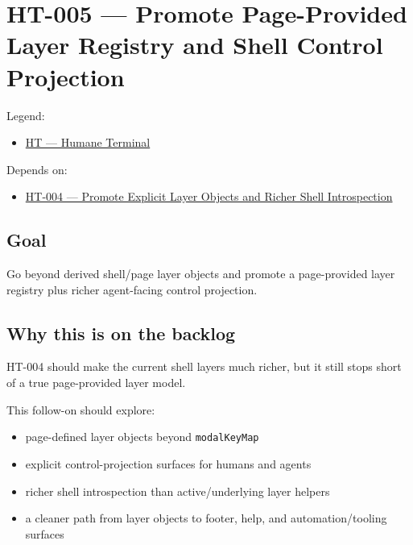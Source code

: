 \chapter{HT-005 --- Promote Page-Provided Layer Registry and Shell Control Projection}\label{record-349}

\smallskip

Legend:

\begin{itemize}
\tightlist
\item
  \href{https://github.com/flyingrobots/bijou/blob/cbd70612140e7a450d764b3c7be1c6af878b99bc/docs/method/graveyard/legends/HT-humane-terminal.md}{HT --- Humane Terminal}
\end{itemize}

Depends on:

\begin{itemize}
\tightlist
\item
  \href{https://github.com/flyingrobots/bijou/blob/cbd70612140e7a450d764b3c7be1c6af878b99bc/docs/method/graveyard/design/HT-004-promote-explicit-layer-objects-and-richer-shell-introspection.md}{HT-004 --- Promote Explicit Layer Objects and Richer Shell Introspection}
\end{itemize}

\section{Goal}\label{record-349-goal}

Go beyond derived shell/page layer objects and promote a page-provided layer registry plus richer agent-facing control projection.

\section{Why this is on the backlog}\label{record-349-why-this-is-on-the-backlog}

HT-004 should make the current shell layers much richer, but it still stops short of a true page-provided layer model.

This follow-on should explore:

\begin{itemize}
\tightlist
\item
  page-defined layer objects beyond \texttt{m\allowbreak{}o\allowbreak{}d\allowbreak{}a\allowbreak{}l\allowbreak{}K\allowbreak{}e\allowbreak{}y\allowbreak{}M\allowbreak{}a\allowbreak{}p}
\item
  explicit control-projection surfaces for humans and agents
\item
  richer shell introspection than active/underlying layer helpers
\item
  a cleaner path from layer objects to footer, help, and automation/tooling surfaces
\end{itemize}

